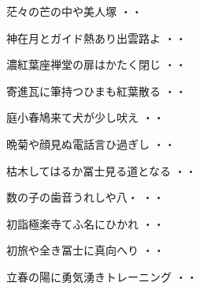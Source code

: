 \vspace{0.6cm}
\begin{shiika}茫々の芒の中や美人塚
\hfill{・・}\end{shiika}
\vspace{0.6cm}
\begin{shiika}神在月とガイド熱あり出雲路よ
\hfill{・・}\end{shiika}
\vspace{0.6cm}
\begin{shiika}濃紅葉座禅堂の扉はかたく閉じ
\hfill{・・}\end{shiika}
\vspace{0.6cm}
\begin{shiika}寄進瓦に筆持つひまも紅葉散る
\hfill{・・}\end{shiika}
\vspace{0.6cm}
\begin{shiika}庭小春鳩来て犬が少し吠え
\hfill{・・}\end{shiika}
\vspace{0.6cm}
\begin{shiika}晩菊や顔見ぬ電話言ひ過ぎし
\hfill{・・}\end{shiika}
\vspace{0.6cm}
\begin{shiika}枯木してはるか冨士見る道となる
\hfill{・・}\end{shiika}
\vspace{0.6cm}
\begin{shiika}数の子の歯音うれしや八・
\hfill{・・}\end{shiika}
\vspace{0.6cm}
\begin{shiika}初詣極楽寺てふ名にひかれ
\hfill{・・}\end{shiika}
\vspace{0.6cm}
\begin{shiika}初旅や全き冨士に真向へり
\hfill{・・}\end{shiika}
\vspace{0.6cm}
\begin{shiika}立春の陽に勇気湧きトレーニング
\hfill{・・}\end{shiika}
